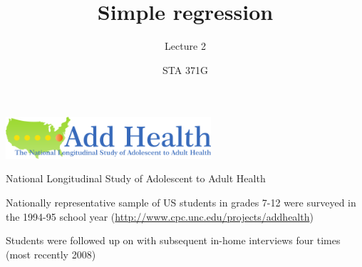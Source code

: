 \documentclass{beamer}\usepackage[]{graphicx}\usepackage[]{color}
\title{Simple regression}
\subtitle{Lecture 2}
\author{STA 371G}
\begin{document}
  
  
  

  \frame{\maketitle}



  \begin{darkframes}
    \begin{frame}
      \begin{center}
        \includegraphics[width=3in]{add-health}

        \bigskip
        National Longitudinal Study of Adolescent to Adult Health

        \bigskip
        Nationally representative sample of US students in grades 7-12 were surveyed in the 1994-95 school year (\url{http://www.cpc.unc.edu/projects/addhealth})

        \bigskip
        Students were followed up on with subsequent in-home interviews four times (most recently 2008)
      \end{center}
    \end{frame}


\end{darkframes}
\end{document}
